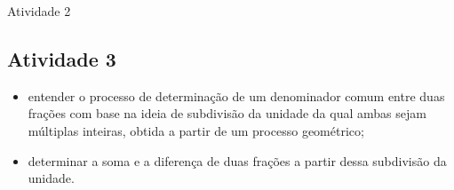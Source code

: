 \begin{multicols}{2}
\begin{resposta*}{Atividade 2}
\end{resposta*}

\Bg


\subsection{Atividade 3}


\newline \vspace{.15cm}

\begin{itemize} %
  \item     entender o processo de determinação de um denominador comum entre duas frações com base na ideia de subdivisão da unidade da qual ambas sejam múltiplas inteiras, obtida a partir de um processo geométrico;
  \item     determinar a soma e a diferença de duas frações a partir dessa subdivisão da unidade.
\end{itemize} %


 \vspace{.15cm}


\end{multicols}

